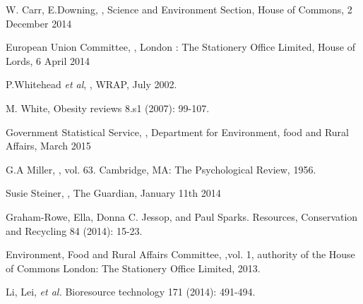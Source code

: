 \documentclass[a4paper, 11pt]{article}
\begin{document}
\begin{thebibliography}{29}

W. Carr, E.Downing, \emph{}, Science and Environment Section, House of Commons, 2 December 2014
\vspace{\baselineskip}

European Union Committee, \emph{}, London : The Stationery Office Limited, House of Lords, 6 April 2014
\vspace{\baselineskip}

P.Whitehead \emph{et al}, \emph{}, WRAP, July 2002.
\vspace{\baselineskip}

M. White, \emph{} Obesity reviews 8.s1 (2007): 99-107.
\vspace{\baselineskip}

Government Statistical Service, \emph{}, Department for Environment, food and Rural Affairs, March 2015
\vspace{\baselineskip}

G.A Miller, \emph{}, vol. 63. Cambridge, MA: The Psychological Review, 1956.
\vspace{\baselineskip}

Susie Steiner, \emph{}, The Guardian, January 11th 2014
\vspace{\baselineskip}

Graham-Rowe, Ella, Donna C. Jessop, and Paul Sparks.\emph{} Resources, Conservation and Recycling 84 (2014): 15-23.
\vspace{\baselineskip}

Environment, Food and Rural Affairs Committee, \emph{},vol. 1, authority of the House of Commons London: The Stationery Office Limited, 2013.
\vspace{\baselineskip}

Li, Lei, \emph{et al.} \emph{} Bioresource technology 171 (2014): 491-494.
\vspace{\baselineskip}


\end{thebibliography}
\end{document}

